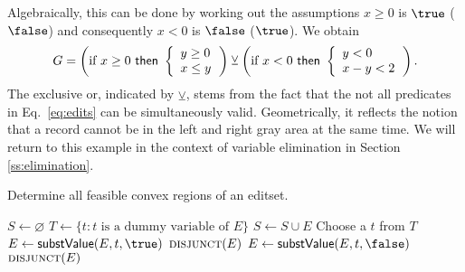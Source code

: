 \documentclass[11pt,fleqn,a4paper]{article}
\begin{document}
Algebraically, this can be done by working out the assumptions $x\geq 0$ is
$\true$ ($\false$) and consequently $x<0$ is $\false$ ($\true$). We obtain
\begin{equation}
G = 
\left(
\textrm{if } x\geq0 \textrm{ \sf then }  \left\{\begin{array}{l}
        y\geq 0\\
        x\leq y\\
\end{array}\right.\right) \veebar
\left(
\textrm{if } x < 0 \textrm{ \sf then } \left\{\begin{array}{l}
        y < 0\\
        x - y < 2\\
\end{array}\right. 
\right).
\label{eq:editlist}
\end{equation}
The exclusive or, indicated by $\veebar$, stems from the fact that the not all
predicates in Eq.\ \eqref{eq:edits} can be simultaneously valid.
Geometrically, it reflects the notion that a record cannot be in the left and
right gray area at the same time. We will return to this example in the context
of variable elimination in Section \ref{ss:elimination}.



%
%
\begin{algorithm}[t]
\caption{Determine all feasible convex regions of an {\sf editset}.}
\label{alg:editlist}
\begin{algorithmic}[1]
    \State $S\leftarrow \varnothing$
    \State $T\leftarrow \{t : t \textrm{ is a dummy variable of }E \}$
        \State $S \leftarrow S\cup E$
    \EndIf
        \State Choose a $t$ from $T$
        \State $E\leftarrow \textrm{\sf substValue}(E,t,\true)$
\label{algp1}  
        \State $\textrm{\sc disjunct}(E)$
        \EndIf
        \State $E\leftarrow \textrm{\sf substValue}(E,t,\false)$
\label{algp2} 
        \State $\textrm{\sc disjunct}(E)$
        \EndIf
    \EndProcedure
\end{algorithmic}
\end{algorithm}
\end{document}
